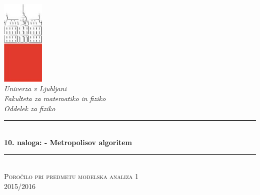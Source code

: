 \documentclass[slovene,11pt,a4paper]{article}
\numberwithin{equation}{section} %
\numberwithin{figure}{section} %
\numberwithin{table}{section} %
\begin{document}
\begin{titlepage}

\newcommand{\HRule}{\rule{\linewidth}{0.5mm}} %

\center %


 

\includegraphics[width=2cm]{slike/aaa}\\[0.5cm]
 
\textit{Univerza v Ljubljani}\\
\textit{Fakulteta za {\color{red}matematiko in fiziko}}\\[0.5cm]

\emph{Oddelek za fiziko}\\[0.5cm] %


\HRule \\[0.4cm]
\huge {\bfseries 10. naloga: - Metropolisov algoritem}\\[0.4cm] %
\HRule \\[0.5cm] 

 \textsc{\large Poročilo pri predmetu modelska analiza 1}\\
 \textsc{\large 2015/2016}\\[1cm] %
 

\end{titlepage}
\end{document}
